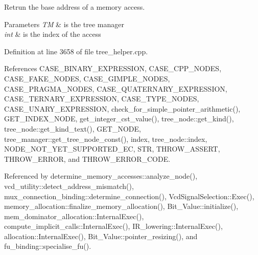 Retrun the base address of a memory access. 


\begin{DoxyParams}{Parameters}
{\em TM} & is the tree manager \\
\hline
{\em int} & is the index of the access \\
\hline
\end{DoxyParams}


Definition at line 3658 of file tree\+\_\+helper.\+cpp.



References C\+A\+S\+E\+\_\+\+B\+I\+N\+A\+R\+Y\+\_\+\+E\+X\+P\+R\+E\+S\+S\+I\+ON, C\+A\+S\+E\+\_\+\+C\+P\+P\+\_\+\+N\+O\+D\+ES, C\+A\+S\+E\+\_\+\+F\+A\+K\+E\+\_\+\+N\+O\+D\+ES, C\+A\+S\+E\+\_\+\+G\+I\+M\+P\+L\+E\+\_\+\+N\+O\+D\+ES, C\+A\+S\+E\+\_\+\+P\+R\+A\+G\+M\+A\+\_\+\+N\+O\+D\+ES, C\+A\+S\+E\+\_\+\+Q\+U\+A\+T\+E\+R\+N\+A\+R\+Y\+\_\+\+E\+X\+P\+R\+E\+S\+S\+I\+ON, C\+A\+S\+E\+\_\+\+T\+E\+R\+N\+A\+R\+Y\+\_\+\+E\+X\+P\+R\+E\+S\+S\+I\+ON, C\+A\+S\+E\+\_\+\+T\+Y\+P\+E\+\_\+\+N\+O\+D\+ES, C\+A\+S\+E\+\_\+\+U\+N\+A\+R\+Y\+\_\+\+E\+X\+P\+R\+E\+S\+S\+I\+ON, check\+\_\+for\+\_\+simple\+\_\+pointer\+\_\+arithmetic(), G\+E\+T\+\_\+\+I\+N\+D\+E\+X\+\_\+\+N\+O\+DE, get\+\_\+integer\+\_\+cst\+\_\+value(), tree\+\_\+node\+::get\+\_\+kind(), tree\+\_\+node\+::get\+\_\+kind\+\_\+text(), G\+E\+T\+\_\+\+N\+O\+DE, tree\+\_\+manager\+::get\+\_\+tree\+\_\+node\+\_\+const(), index, tree\+\_\+node\+::index, N\+O\+D\+E\+\_\+\+N\+O\+T\+\_\+\+Y\+E\+T\+\_\+\+S\+U\+P\+P\+O\+R\+T\+E\+D\+\_\+\+EC, S\+TR, T\+H\+R\+O\+W\+\_\+\+A\+S\+S\+E\+RT, T\+H\+R\+O\+W\+\_\+\+E\+R\+R\+OR, and T\+H\+R\+O\+W\+\_\+\+E\+R\+R\+O\+R\+\_\+\+C\+O\+DE.



Referenced by determine\+\_\+memory\+\_\+accesses\+::analyze\+\_\+node(), vcd\+\_\+utility\+::detect\+\_\+address\+\_\+mismatch(), mux\+\_\+connection\+\_\+binding\+::determine\+\_\+connection(), Vcd\+Signal\+Selection\+::\+Exec(), memory\+\_\+allocation\+::finalize\+\_\+memory\+\_\+allocation(), Bit\+\_\+\+Value\+::initialize(), mem\+\_\+dominator\+\_\+allocation\+::\+Internal\+Exec(), compute\+\_\+implicit\+\_\+calls\+::\+Internal\+Exec(), I\+R\+\_\+lowering\+::\+Internal\+Exec(), allocation\+::\+Internal\+Exec(), Bit\+\_\+\+Value\+::pointer\+\_\+resizing(), and fu\+\_\+binding\+::specialise\+\_\+fu().

